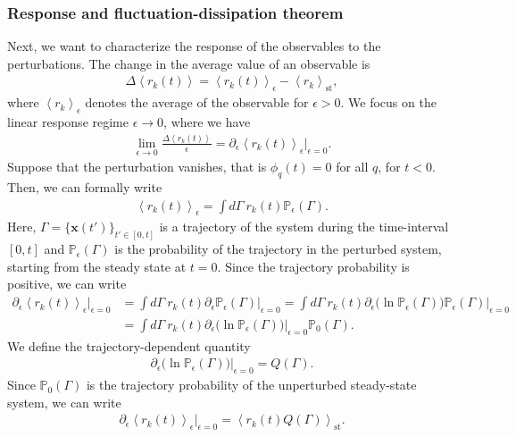 \documentclass[aps,pre,twocolumn,superscriptaddress,notitlepage]{revtex4-2}
\newcommand{\Av}[1]{\left\langle #1 \right\rangle}
\newcommand{\nn}{\nonumber \\}
\begin{document}
\subsubsection{Response and fluctuation-dissipation theorem}
Next, we want to characterize the response of the observables to the perturbations.
The change in the average value of an observable is
\begin{align}
\Delta \Av{r_k(t)} = \Av{r_k(t)}_\epsilon - \Av{r_k}_\text{st} ,
\end{align}
where $\Av{r_k}_\epsilon$ denotes the average of the observable for $\epsilon > 0$.
We focus on the linear response regime $\epsilon \rightarrow 0$, where we have
\begin{align}
\lim_{\epsilon \rightarrow 0} \frac{\Delta \Av{r_k(t)}}{\epsilon} = \partial_\epsilon \Av{r_k(t)}_\epsilon \Big\vert_{\epsilon = 0} .
\end{align}
Suppose that the perturbation vanishes, that is $\phi_q(t) = 0$ for all $q$, for $t < 0$.
Then, we can formally write
\begin{align}
\Av{r_k(t)}_\epsilon = \int d\Gamma \ r_k(t) \mathbb{P}_\epsilon(\Gamma) .
\end{align}
Here, $\Gamma = \lbrace\bm{x}(t')\rbrace_{t' \in [0,t]}$ is a trajectory of the system during the time-interval $[0,t]$ and $\mathbb{P}_\epsilon(\Gamma)$ is the probability of the trajectory in the perturbed system, starting from the steady state at $t = 0$.
Since the trajectory probability is positive, we can write
\begin{align}
\partial_\epsilon \Av{r_k(t)}_\epsilon \Big\vert_{\epsilon = 0} &= \int d\Gamma \ r_k(t) \partial_\epsilon \mathbb{P}_\epsilon(\Gamma) \Big\vert_{\epsilon = 0} = \int d\Gamma \ r_k(t) \partial_\epsilon \big(\ln \mathbb{P}_\epsilon(\Gamma) \big) \mathbb{P}_\epsilon(\Gamma) \Big\vert_{\epsilon = 0} \nn
& = \int d\Gamma \ r_k(t) \partial_\epsilon \big(\ln \mathbb{P}_\epsilon(\Gamma) \big) \Big\vert_{\epsilon = 0} \mathbb{P}_0(\Gamma) .
\end{align}
We define the trajectory-dependent quantity
\begin{align}
\partial_\epsilon \big(\ln \mathbb{P}_\epsilon(\Gamma) \big) \Big\vert_{\epsilon = 0} = Q(\Gamma) .
\end{align}
Since $\mathbb{P}_0(\Gamma)$ is the trajectory probability of the unperturbed steady-state system, we can write
\begin{align}
\partial_\epsilon \Av{r_k(t)}_\epsilon \Big\vert_{\epsilon = 0} = \Av{r_k(t) Q(\Gamma)}_\text{st} .
\end{align}
\end{document}

